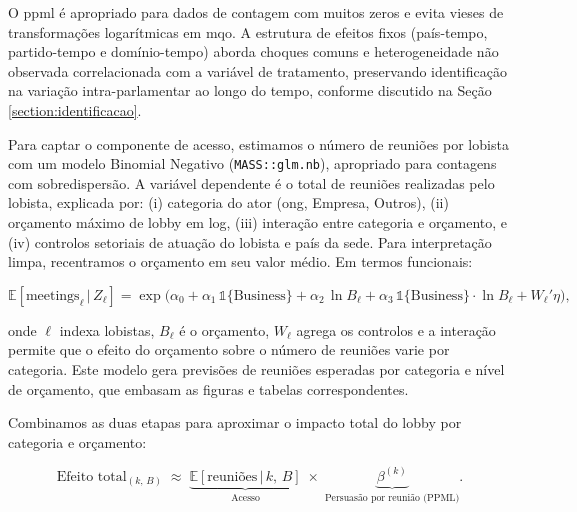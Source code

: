 O \acrshort{ppml} é apropriado para dados de contagem com muitos zeros e evita vieses de transformações logarítmicas em \acrshort{mqo}. A estrutura de efeitos fixos (país-tempo, partido-tempo e domínio-tempo) aborda choques comuns e heterogeneidade não observada correlacionada com a variável de tratamento, preservando identificação na variação intra-parlamentar ao longo do tempo, conforme discutido na Seção \ref{section:identificacao}.

Para captar o componente de acesso, estimamos o número de reuniões por lobista com um modelo Binomial Negativo (\texttt{MASS::glm.nb}), apropriado para contagens com sobredispersão. A variável dependente é o total de reuniões realizadas pelo lobista, explicada por: (i) categoria do ator (\acrshort{ong}, Empresa, Outros), (ii) orçamento máximo de lobby em log, (iii) interação entre categoria e orçamento, e (iv) controlos setoriais de atuação do lobista e país da sede. Para interpretação limpa, recentramos o orçamento em seu valor médio. Em termos funcionais:

\begin{equation}
    \mathbb{E}[\text{meetings}_\ell\,|\,Z_\ell] = \exp\big(\alpha_0 + \alpha_1\,\mathbb{1}\{\text{Business}\} + \alpha_2\,\ln B_\ell + \alpha_3\,\mathbb{1}\{\text{Business}\}\cdot\ln B_\ell + W_\ell'\eta\big),
\end{equation}

onde $\ell$ indexa lobistas, $B_\ell$ é o orçamento, $W_\ell$ agrega os controlos e a interação permite que o efeito do orçamento sobre o número de reuniões varie por categoria. Este modelo gera previsões de reuniões esperadas por categoria e nível de orçamento, que embasam as figuras e tabelas correspondentes.

Combinamos as duas etapas para aproximar o impacto total do lobby por categoria e orçamento:

\begin{equation}
    \text{Efeito total}_{(k,\,B)} \;\approx\; \underbrace{\mathbb{E}[\text{reuniões}\,|\,k,\,B]}_{\text{Acesso}}\;\times\; \underbrace{\beta^{(k)}}_{\text{Persuasão por reunião (PPML)}}.
\end{equation}

